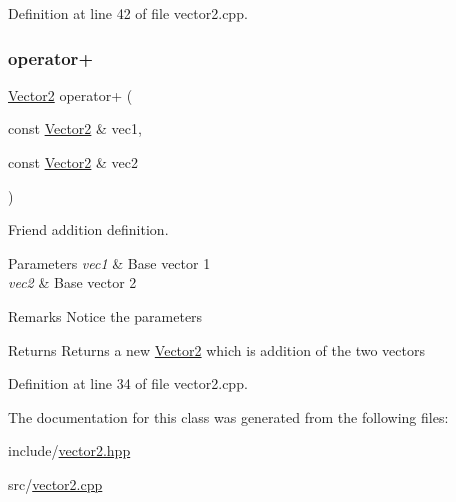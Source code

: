 Definition at line 42 of file vector2.\+cpp.

\mbox{\label{classVector2_aec551a9b18e5851febf60c555fc382ab}} 
\subsubsection{\texorpdfstring{operator+}{operator+}\hspace{0.1cm}{\footnotesize\ttfamily [2/2]}}
{\footnotesize\ttfamily \mbox{\hyperlink{classVector2}{Vector2}} operator+ (\begin{DoxyParamCaption}\item[{const \mbox{\hyperlink{classVector2}{Vector2}} \&}]{vec1,  }\item[{const \mbox{\hyperlink{classVector2}{Vector2}} \&}]{vec2 }\end{DoxyParamCaption})\hspace{0.3cm}{\ttfamily [friend]}}



Friend addition definition. 


\begin{DoxyParams}{Parameters}
{\em vec1} & Base vector 1 \\
\hline
{\em vec2} & Base vector 2 \\
\hline
\end{DoxyParams}
\begin{DoxyRemark}{Remarks}
Notice the parameters 
\end{DoxyRemark}
\begin{DoxyReturn}{Returns}
Returns a new \mbox{\hyperlink{classVector2}{Vector2}} which is addition of the two vectors 
\end{DoxyReturn}


Definition at line 34 of file vector2.\+cpp.



The documentation for this class was generated from the following files\+:\begin{DoxyCompactItemize}
\item 
include/\mbox{\hyperlink{vector2_8hpp}{vector2.\+hpp}}\item 
src/\mbox{\hyperlink{vector2_8cpp}{vector2.\+cpp}}\end{DoxyCompactItemize}
